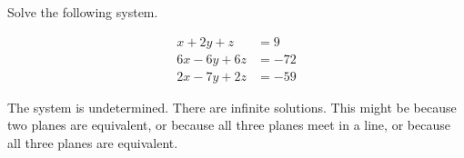 
\begin{question}
Solve the following system.

\[\begin{aligned}
x + 2 y + z&=9\\
6 x - 6 y + 6 z&=-72\\
2 x - 7 y + 2 z&=-59
\end{aligned}\]
\end{question}

\begin{solution}
The system is undetermined. There are infinite solutions. This might be
because two planes are equivalent, or because all three planes meet in a
line, or because all three planes are equivalent.
\end{solution}

